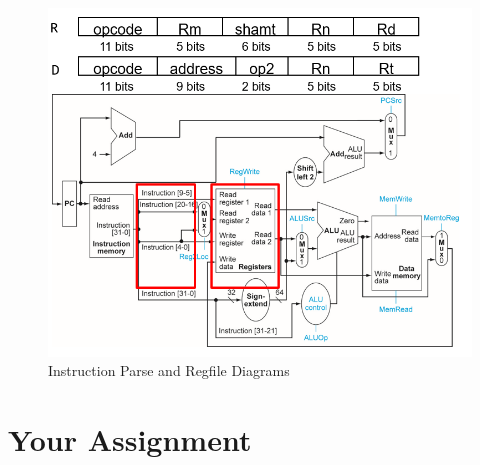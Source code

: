 \begin{figure}
	\caption{Instruction Parse and Regfile Diagrams}\label{fig:register_file_cutout}
	\begin{center}
		\includegraphics[width=4.75in]{../images/register_file_cutout.png}
	\end{center}
\end{figure} 


\clearpage
\section{Your Assignment}

